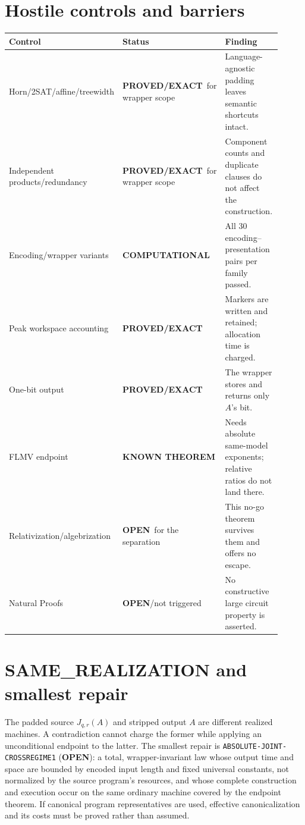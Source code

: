 \documentclass[11pt]{article}
\newcommand{\OPEN}{\textbf{OPEN}}
\newcommand{\EXACT}{\textbf{PROVED/EXACT}}
\newcommand{\COMP}{\textbf{COMPUTATIONAL}}
\newcommand{\KNOWN}{\textbf{KNOWN THEOREM}}
\begin{document}
\section{Hostile controls and barriers}

\begin{center}
\begin{tabular}{p{0.26\linewidth}p{0.17\linewidth}p{0.48\linewidth}}
\toprule
Control & Status & Finding \\
\midrule
Horn/2SAT/affine/treewidth & \EXACT\ for wrapper scope & Language-agnostic padding leaves semantic shortcuts intact. \\
Independent products/redundancy & \EXACT\ for wrapper scope & Component counts and duplicate clauses do not affect the construction. \\
Encoding/wrapper variants & \COMP & All 30 encoding--presentation pairs per family passed. \\
Peak workspace accounting & \EXACT & Markers are written and retained; allocation time is charged. \\
One-bit output & \EXACT & The wrapper stores and returns only $A$'s bit. \\
FLMV endpoint & \KNOWN & Needs absolute same-model exponents; relative ratios do not land there. \\
Relativization/algebrization & \OPEN\ for the separation & This no-go theorem survives them and offers no escape. \\
Natural Proofs & \OPEN/not triggered & No constructive large circuit property is asserted. \\
\bottomrule
\end{tabular}
\end{center}

\section{SAME\_REALIZATION and smallest repair}

The padded source $J_{q,r}(A)$ and stripped output $A$ are different realized
machines.  A contradiction cannot charge the former while applying an
unconditional endpoint to the latter.  The smallest repair is
\texttt{ABSOLUTE-JOINT-CROSSREGIME1} (\OPEN): a total, wrapper-invariant law
whose output time and space are bounded by encoded input length and fixed
universal constants, not normalized by the source program's resources, and
whose complete construction and execution occur on the same ordinary machine
covered by the endpoint theorem.  If canonical program representatives are
used, effective canonicalization and its costs must be proved rather than
assumed.
\end{document}
